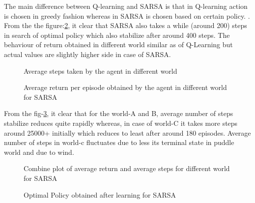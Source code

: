 \documentclass[preprint,12pt]{elsarticle}
\begin{document}
The main difference between Q-learning and SARSA is that in Q-learning action is chosen in greedy fashion whereas in SARSA is chosen based on certain policy. \cite{medium}. From the the figure:\ref{fig:returnS}, it clear that SARSA also takes a while (around 200) steps in search of optimal policy which also stabilize after around 400 steps. The behaviour of return obtained in different world similar as of Q-Learning but actual values are slightly higher side in case of SARSA.

\begin{figure}[H]
	\centering  
	\caption{Average steps taken by the agent in different world}
	\label{fig:stepsS}
\end{figure}

\begin{figure}[H]
	\centering  
	\caption{Average return per episode obtained by the agent in different world for SARSA}
	\label{fig:returnS}
\end{figure}

From the fig-\ref{fig:combiS}, it clear that for the world-A and B, average number of steps stabilize reduces quite rapidly  whereas, in case of world-C it takes more steps around 25000+ initially which reduces to least after around 180 episodes. Average number of steps in world-c fluctuates due to less its terminal state in puddle world and due to wind. 


\begin{figure}[H]
	\centering  
	\caption{Combine plot of average return and average steps for different world for SARSA}
	\label{fig:combiS}
\end{figure}


\begin{figure}[H]
	\centering  
	\caption{Optimal Policy obtained after learning for SARSA}
	\label{fig:policyS}
\end{figure}
\end{document}
